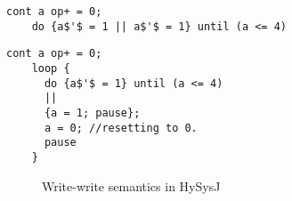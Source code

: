 \documentclass[10pt,journal,cspaper,compsoc]{IEEEtran}
\begin{document}
\newbox{\swtwo}
\begin{lrbox}{\swtwo}
  \begin{lstlisting}[mathescape,style=sysj,morekeywords={until,wait_inbetween,
      cont,input,signal,loop,abort,await,emit,present,trap,pause,exit,delay,suspend}]
    cont a op+ = 0;
    do {a$'$ = 1 || a$'$ = 1} until (a <= 4)
  \end{lstlisting}
\end{lrbox}

\newbox{\swone}
\begin{lrbox}{\swone}
  \begin{lstlisting}[mathescape,style=sysj,morekeywords={until,wait_inbetween,
      cont,input,signal,loop,abort,await,emit,present,trap,pause,exit,delay,suspend}]
    cont a op+ = 0;
    loop {
      do {a$'$ = 1} until (a <= 4)
      ||
      {a = 1; pause};
      a = 0; //resetting to 0.
      pause
    }
  \end{lstlisting}
\end{lrbox}

\begin{figure}[t!]
  \centering
  \subfloat[Example of simultaneous writes to the same continuous
  variable in HySysJ. WCRT= 2]{
    \usebox\swone
    \label{fig:18a}}
  
  \subfloat[Example of simultaneous writes to the same continuous
  variable in HySysJ. WCRT=2]{ \usebox\swtwo
    \label{fig:18c}}
  \hspace{20pt}
  \caption{Write-write semantics in HySysJ}
  \label{fig:18}
\end{figure}
\end{document}
